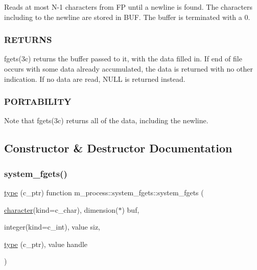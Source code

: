 Reads at most N-\/1 characters from FP until a newline is found. The characters including to the newline are stored in B\+UF. The buffer is terminated with a 0. \subsubsection*{R\+E\+T\+U\+R\+NS}

fgets(3c) returns the buffer passed to it, with the data filled in. If end of file occurs with some data already accumulated, the data is returned with no other indication. If no data are read, N\+U\+LL is returned instead. \subsubsection*{P\+O\+R\+T\+A\+B\+I\+L\+I\+TY}

Note that fgets(3c) returns all of the data, including the newline. 

\subsection{Constructor \& Destructor Documentation}
\mbox{\label{interfacem__process_1_1system__fgets_a33f5f4ba1ea0fe4e0b757d7fa5e8a571}} 
\subsubsection{\texorpdfstring{system\+\_\+fgets()}{system\_fgets()}}
{\footnotesize\ttfamily \hyperlink{stop__watch_83_8txt_a70f0ead91c32e25323c03265aa302c1c}{type} (c\+\_\+ptr) function m\+\_\+process\+::system\+\_\+fgets\+::system\+\_\+fgets (\begin{DoxyParamCaption}\item[{\hyperlink{option__stopwatch_83_8txt_abd4b21fbbd175834027b5224bfe97e66}{character}(kind=c\+\_\+char), dimension($\ast$)}]{buf,  }\item[{integer(kind=c\+\_\+int), value}]{siz,  }\item[{\hyperlink{stop__watch_83_8txt_a70f0ead91c32e25323c03265aa302c1c}{type} (c\+\_\+ptr), value}]{handle }\end{DoxyParamCaption})\hspace{0.3cm}{\ttfamily [private]}}



